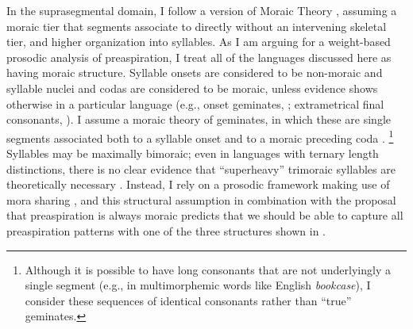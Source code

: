 \documentclass[output=paper,colorlinks,citecolor=brown]{langscibook}
\begin{document}
\largerpage[-1]
In the suprasegmental domain, I follow a version of Moraic Theory \citep{hyman1985,mccarthyprince1986,hayes1989}, assuming a moraic tier that segments associate to directly without an intervening skeletal tier, and higher organization into syllables. As I am arguing for a weight-based prosodic analysis of preaspiration, I treat all of the languages discussed here as having moraic structure.
Syllable onsets are considered to be non-moraic and syllable nuclei and codas are considered to be moraic, unless evidence shows otherwise in a particular language (e.g., onset geminates, \citealp{topintzi2008}; extrametrical final consonants, \citealp{kristoffersen1999}). I assume a moraic theory of geminates, in which these are single segments associated both to a syllable onset and to a moraic preceding coda \citep{hayes1989,davis2011}.%
\footnote{Although it is possible to have long consonants that are not underlyingly a single segment (e.g., in multimorphemic words like English \textit{bookcase}), I consider these sequences of identical consonants rather than ``true'' geminates.}
Syllables may be maximally bimoraic; even in languages with ternary length distinctions, there is no clear evidence that ``superheavy'' trimoraic syllables are theoretically necessary \citep[e.g.,][]{bye2005,balsbaal2012,prehn2012}. Instead, I rely on a prosodic framework making use of mora sharing \citep{maddieson1993,hubbard1994,broselowetal1997}, and this structural assumption in combination with the proposal that preaspiration is always moraic predicts that we should be able to capture all preaspiration patterns with one of the three structures shown in .
\end{document}
